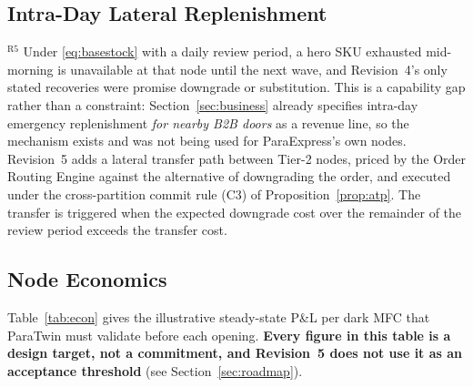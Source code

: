 \subsection{Intra-Day Lateral Replenishment}\label{sec:lateral}
$^{\mathrm{R5}}$ Under \eqref{eq:basestock} with a daily review period, a hero SKU exhausted mid-morning is unavailable at that node until the next wave, and Revision~4's only stated recoveries were promise downgrade or substitution. This is a capability gap rather than a constraint: Section~\ref{sec:business} already specifies intra-day emergency replenishment \emph{for nearby B2B doors} as a revenue line, so the mechanism exists and was not being used for ParaExpress's own nodes. Revision~5 adds a lateral transfer path between Tier-2 nodes, priced by the Order Routing Engine against the alternative of downgrading the order, and executed under the cross-partition commit rule (C3) of Proposition~\ref{prop:atp}. The transfer is triggered when the expected downgrade cost over the remainder of the review period exceeds the transfer cost.

\subsection{Node Economics}
Table~\ref{tab:econ} gives the illustrative steady-state P\&L per dark MFC that ParaTwin must validate before each opening. \textbf{Every figure in this table is a design target, not a commitment, and Revision~5 does not use it as an acceptance threshold} (see Section~\ref{sec:roadmap}).

